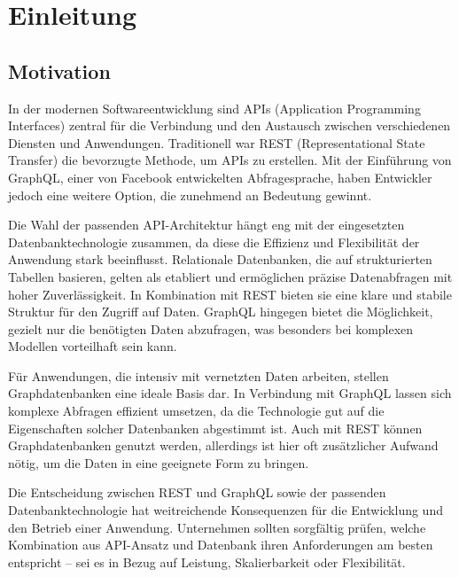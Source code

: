 \chapter{Einleitung} %
\label{sec:einleitung}
\section{Motivation} %
\label{sec:motivation}
In der modernen Softwareentwicklung sind APIs (Application Programming Interfaces) zentral für die Verbindung und den Austausch zwischen verschiedenen Diensten und Anwendungen. Traditionell war REST (Representational State Transfer) die bevorzugte Methode, um APIs zu erstellen. Mit der Einführung von GraphQL, einer von Facebook entwickelten Abfragesprache, haben Entwickler jedoch eine weitere Option, die zunehmend an Bedeutung gewinnt.

\noindent
Die Wahl der passenden API-Architektur hängt eng mit der eingesetzten Datenbanktechnologie zusammen, da diese die Effizienz und Flexibilität der Anwendung stark beeinflusst. Relationale Datenbanken, die auf strukturierten Tabellen basieren, gelten als etabliert und ermöglichen präzise Datenabfragen mit hoher Zuverlässigkeit. In Kombination mit REST bieten sie eine klare und stabile Struktur für den Zugriff auf Daten. GraphQL hingegen bietet die Möglichkeit, gezielt nur die benötigten Daten abzufragen, was besonders bei komplexen Modellen vorteilhaft sein kann.

\noindent
Für Anwendungen, die intensiv mit vernetzten Daten arbeiten, stellen Graphdatenbanken eine ideale Basis dar. In Verbindung mit GraphQL lassen sich komplexe Abfragen effizient umsetzen, da die Technologie gut auf die Eigenschaften solcher Datenbanken abgestimmt ist. Auch mit REST können Graphdatenbanken genutzt werden, allerdings ist hier oft zusätzlicher Aufwand nötig, um die Daten in eine geeignete Form zu bringen.

\noindent
Die Entscheidung zwischen REST und GraphQL sowie der passenden Datenbanktechnologie hat weitreichende Konsequenzen für die Entwicklung und den Betrieb einer Anwendung. Unternehmen sollten sorgfältig prüfen, welche Kombination aus API-Ansatz und Datenbank ihren Anforderungen am besten entspricht – sei es in Bezug auf Leistung, Skalierbarkeit oder Flexibilität.
\newpage

